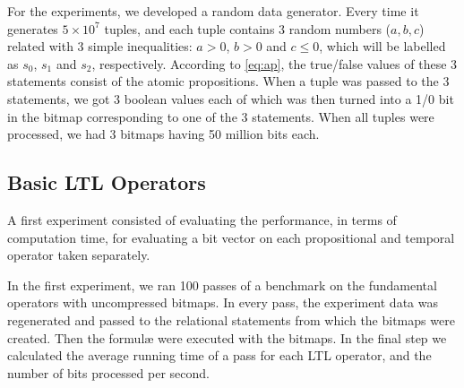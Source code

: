 For the experiments, we developed a random data generator. Every time it generates $5 \times 10^7$ tuples, and each tuple contains 3 random numbers ($a, b, c$) related with 3 simple inequalities: $a > 0$, $b > 0$ and $c \leq 0$, which will be labelled as $s_0$, $s_1$ and $s_2$, respectively. According to \eqref{eq:ap}, the true/false values of these 3 statements consist of the atomic propositions. When a tuple was passed to the 3 statements, we got 3 boolean values each of which was then turned into a 1/0 bit in the bitmap corresponding to one of the 3 statements. When all tuples were processed, we had 3 bitmaps having 50 million bits each.




\subsection{Basic LTL Operators} %

A first experiment consisted of evaluating the performance, in terms of computation time, for evaluating a bit vector on each propositional and temporal operator taken separately.

In the first experiment, we ran 100 passes of a benchmark on the fundamental operators with uncompressed bitmaps. In every pass, the experiment data was regenerated and passed to the relational statements from which the bitmaps were created. Then the formul\ae{} were executed with the bitmaps. In the final step we calculated the average running time of a pass for each LTL operator, and the number of bits processed per second.


